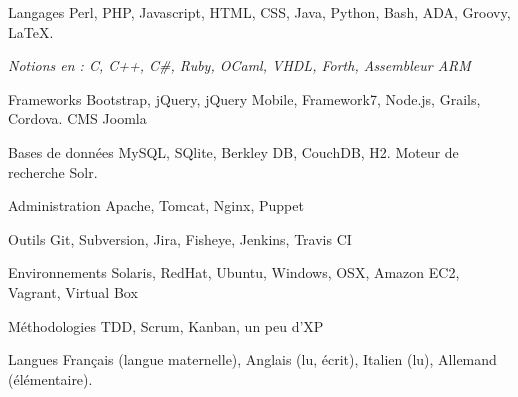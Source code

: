 
\begin{cvskills}

  \cvskill
    {Langages}
    {Perl, PHP, Javascript, HTML, CSS, Java, Python, Bash, ADA, Groovy, LaTeX.
    }

  \cvskill
    {}
    {\textit{Notions en : C, C++, C\#, Ruby, OCaml, VHDL, Forth, Assembleur ARM}}

  \cvskill
    {Frameworks}
    {Bootstrap, jQuery, jQuery Mobile, Framework7, Node.js, Grails, Cordova. CMS Joomla}

  \cvskill
    {Bases de données}
    {MySQL, SQlite, Berkley DB, CouchDB, H2. Moteur de recherche Solr.}

  \cvskill
    {Administration}
    {Apache, Tomcat, Nginx, Puppet}

  \cvskill
    {Outils}
    {Git, Subversion, Jira, Fisheye, Jenkins, Travis CI}

  \cvskill
    {Environnements}
    {Solaris, RedHat, Ubuntu, Windows, OSX, Amazon EC2, Vagrant, Virtual Box}

  \cvskill
    {Méthodologies}
    {TDD, Scrum, Kanban, un peu d'XP}

  \cvskill
    {Langues}
    {Français (langue maternelle), Anglais (lu, écrit), Italien (lu), Allemand (élémentaire).}

\end{cvskills}
